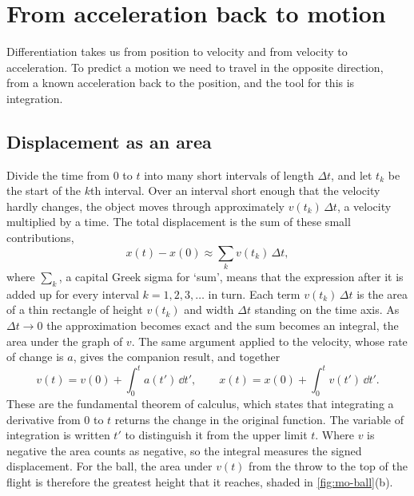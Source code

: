 \section{From acceleration back to motion}
\label{sec:mo-integrating}

Differentiation takes us from position to velocity and from velocity to
acceleration. To predict a motion we need to travel in the opposite
direction, from a known acceleration back to the position, and the tool
for this is integration.

\subsection*{Displacement as an area}

Divide the time from $0$ to $t$ into many short intervals of length
$\Delta t$, and let $t_k$ be the start of the $k$th interval. Over an
interval short enough that the velocity hardly changes, the object moves
through approximately $v(t_k)\,\Delta t$, a velocity multiplied by a time.
The total displacement is the sum of these small contributions,
\begin{equation*}
   x(t) - x(0) \approx \sum_k v(t_k)\,\Delta t ,
\end{equation*}
where $\sum_k$, a capital Greek sigma for `sum', means that the
expression after it is added up for every interval $k = 1, 2, 3, \dots$
in turn. Each term $v(t_k)\,\Delta t$ is the area of a thin rectangle of height
$v(t_k)$ and width $\Delta t$ standing on the time axis. As $\Delta t \to
0$ the approximation becomes exact and the sum becomes an integral, the
area under the graph of $v$. The same argument applied to the velocity,
whose rate of change is $a$, gives the companion result, and together
\begin{equation}
   v(t) = v(0) + \int_0^t a(t')\,\dd t', \qquad
   x(t) = x(0) + \int_0^t v(t')\,\dd t' .
   \label{eq:mo-integrals}
\end{equation}
These are the fundamental theorem of calculus, which states that
integrating a derivative from $0$ to $t$ returns the change in the
original function. The variable of integration is written $t'$ to
distinguish it from the upper limit $t$. Where $v$ is negative the area
counts as negative, so the integral measures the signed displacement. For
the ball, the area under $v(t)$ from the throw to the top of the flight is
therefore the greatest height that it reaches, shaded in
\cref{fig:mo-ball}(b).

